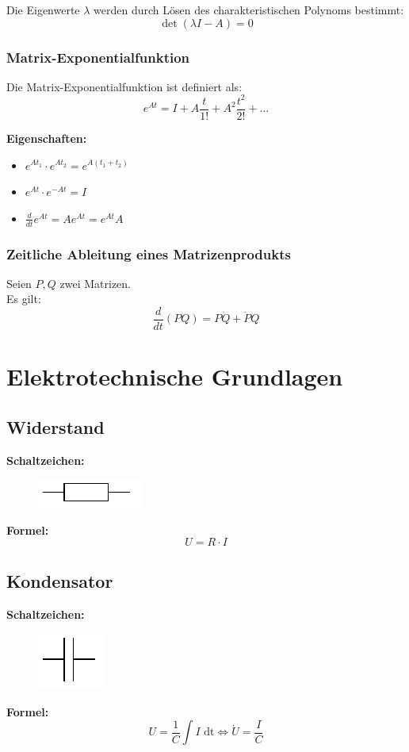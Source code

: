\documentclass[10pt,a4paper]{article}
\begin{document}
Die Eigenwerte $\lambda$ werden durch Lösen des charakteristischen Polynoms bestimmt:
$$
	\det(\lambda I - A) = 0
$$

\subsubsection{Matrix-Exponentialfunktion}
Die Matrix-Exponentialfunktion ist definiert als:
$$
	e^{At} = I + A\frac{t}{1!} + A^2 \frac{t^2}{2!} + \dots
$$

\textbf{Eigenschaften:}
\begin{itemize}
	\item $e^{At_1} ⋅ e^{At_2} = e^{A(t_1 + t_2)}$
	\item $e^{At} ⋅ e^{-At} = I$
	\item $\frac{d}{dt} e^{At} = Ae^{At} = e^{At}A$
\end{itemize}

\subsubsection{Zeitliche Ableitung eines Matrizenprodukts}
Seien $P,Q$ zwei Matrizen. \\
Es gilt:
$$
	\frac{d}{dt}(PQ) = P \dot Q + \dot P Q
$$

\section{Elektrotechnische Grundlagen}
\subsection{Widerstand}
\textbf{Schaltzeichen:} \\
\begin{figure}[H]
	\includegraphics[width=0.15\columnwidth]{imgs/widerstand.pdf}
\end{figure}
\textbf{Formel:}
$$
	U = R ⋅ I
$$

\subsection{Kondensator}
\textbf{Schaltzeichen:} \\
\begin{figure}[H]
	\includegraphics[width=0.1\columnwidth]{imgs/kondensator.pdf}
\end{figure}
\textbf{Formel:}
$$
	U = \frac 1 C \int I \textrm{ dt} \iff \dot U = \frac I C
$$
\end{document}
